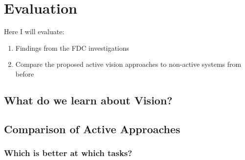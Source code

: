 \chapter{Evaluation}
Here I will evaluate:
\begin{enumerate}
  \item Findings from the FDC investigations
  \item Compare the proposed active vision approaches to non-active systems from before
\end{enumerate}

\section{What do we learn about Vision?}

\section{Comparison of Active Approaches}

\subsection{Which is better at which tasks?}
